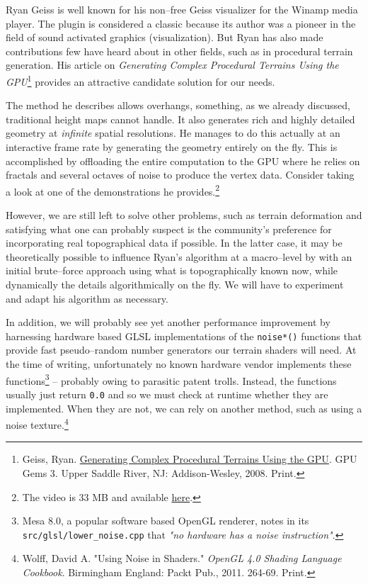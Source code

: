 Ryan Geiss is well known for his non--free Geiss visualizer for the Winamp media player. The plugin is considered a classic because its author was a pioneer in the field of sound activated graphics (visualization). But Ryan has also made contributions few have heard about in other fields, such as in procedural terrain generation. His article on {\it Generating Complex Procedural Terrains Using the GPU}\footnote{Geiss, Ryan. \href{http://http.developer.nvidia.com/GPUGems3/gpugems3_ch01.html}{Generating Complex Procedural Terrains Using the GPU}. GPU Gems 3. Upper Saddle River, NJ: Addison-Wesley, 2008. Print.} provides an attractive candidate solution for our needs. 

The method he describes allows overhangs, something, as we already discussed, traditional height maps cannot handle. It also generates rich and highly detailed geometry at {\it infinite} spatial resolutions. He manages to do this actually at an interactive frame rate by generating the geometry entirely on the fly. This is accomplished by offloading the entire computation to the GPU where he relies on fractals and several octaves of noise to produce the vertex data. Consider taking a look at one of the demonstrations he provides.\footnote{The video is 33 MB and available \href{http://www.geisswerks.com/gpugems3ch/MVI_7867.avi}{here}.}

However, we are still left to solve other problems, such as terrain deformation and satisfying what one can probably suspect is the community's preference for incorporating real topographical data if possible. In the latter case, it may be theoretically possible to influence Ryan's algorithm at a macro--level by  with an initial brute--force approach using what is topographically known now, while dynamically  the details algorithmically on the fly. We will have to experiment and adapt his algorithm as necessary.

In addition, we will probably see yet another performance improvement by harnessing hardware based GLSL implementations of the {\tt noise*()} functions that provide fast pseudo--random number generators our terrain shaders will need. At the time of writing, unfortunately no known hardware vendor implements these functions\footnote{Mesa 8.0, a popular software based OpenGL renderer, notes in its {\tt src/glsl/lower_noise.cpp} that {\it "no hardware has a noise instruction"}.} -- probably owing to parasitic patent trolls. Instead, the functions usually just return {\tt 0.0} and so we must check at runtime whether they are implemented. When they are not, we can rely on another method, such as using a noise texture.\footnote{Wolff, David A. "Using Noise in Shaders." {\it OpenGL 4.0 Shading Language Cookbook}. Birmingham England: Packt Pub., 2011. 264-69. Print.}

